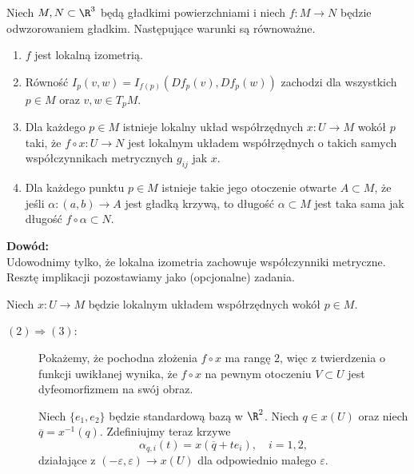 \begin{frame}[<+->]

\begin{lemat}\label{lem:loc-isometry-prop}
Niech $M,N\subset \R^3$ będą gładkimi powierzchniami i niech $f\colon M\to N$ będzie odwzorowaniem gładkim. Następujące warunki są równoważne.

\begin{enumerate}
\item $f$ jest lokalną izometrią.
\item Równość $I_p(v,w)=I_{f(p)}(Df_p(v),Df_p(w))$ zachodzi dla wszystkich $p\in M$ oraz $v,w\in T_pM$.

\item Dla każdego $p\in M$ istnieje lokalny układ współrzędnych $x\colon U\to M$ wokół $p$ taki, że $f\circ x\colon U\to N$ jest lokalnym układem współrzędnych o takich samych współczynnikach metrycznych $g_{ij}$ jak $x$.

\item Dla każdego punktu $p\in M$ istnieje takie jego otoczenie otwarte $A\subset M$, że jeśli $\alpha \colon(a,b)\to A$ jest gładką krzywą, to długość $\alpha\subset M$ jest taka sama jak długość $f\circ \alpha\subset N$.
\end{enumerate}
\end{lemat}
\end{frame}
\begin{frame}[<+->]
\textcolor{ared}{\textbf{Dowód:}}\\\pause
Udowodnimy tylko, że lokalna izometria zachowuje współczynniki metryczne. Resztę implikacji pozostawiamy jako (opcjonalne) zadania.

\pause Niech $x\colon U\to M$ będzie lokalnym układem współrzędnych wokół $p\in M$.
\begin{description}
\item [$(2)\Rightarrow (3)$: ] Pokażemy, że pochodna złożenia $f\circ x$ ma rangę $2$, więc z twierdzenia o funkcji uwikłanej wynika, że $f\circ x$ na pewnym otoczeniu $V\subset U$ jest dyfeomorfizmem na swój obraz.

\pause Niech $\{e_1,e_2\}$ będzie standardową bazą w $\R^2$. Niech $q\in x(U)$ oraz niech $\overline{q}=x^{-1}(q)$. \pause Zdefiniujmy teraz krzywe \[\alpha_{q,i}(t)=x(\overline{q}+te_i),\quad i=1,2,\]
działające z $(-\varepsilon,\varepsilon)\to x(U)$ dla odpowiednio małego $\varepsilon$. 
\end{description}
\end{frame}
